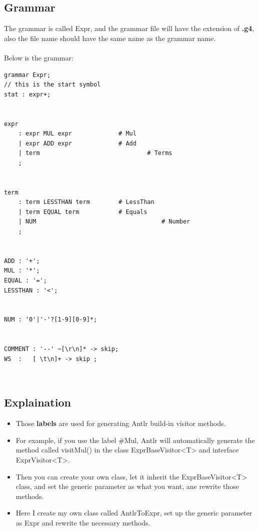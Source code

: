 \documentclass[a4paper,12pt,titlepage]{article}
\begin{document}
\subsection{Grammar}
The grammar is called {\footnotesize\ttfamily Expr}, and the grammar file will have the extension of {\bf .g4}, also the file name should have the same name as the grammar name.
\\
\\
Below is the grammar:
\begin{lstlisting}
grammar Expr;
// this is the start symbol
stat : expr+;


expr
	: expr MUL expr 			# Mul
	| expr ADD expr 			# Add
	| term 								# Terms
	;


term
	: term LESSTHAN term 		# LessThan
	| term EQUAL term 			# Equals
	| NUM 									# Number
	;


ADD : '+';
MUL : '*';
EQUAL : '=';
LESSTHAN : '<';


NUM : '0'|'-'?[1-9][0-9]*;


COMMENT : '--' ~[\r\n]* -> skip;
WS  :   [ \t\n]+ -> skip ;
\end{lstlisting}
~\\

\subsection{Explaination}
\begin{itemize}
  	\item Those {\bf labels} are used for generating Antlr build-in visitor methods.
  	\item For example, if you use the label {\footnotesize\ttfamily \#Mul}, Antlr will automatically generate the method called {\footnotesize\ttfamily visitMul()} in the class {\footnotesize\ttfamily ExprBaseVisitor<T>} and interface {\footnotesize\ttfamily ExprVisitor<T>}.
	\item Then you can create your own class, let it inherit the {\footnotesize\ttfamily ExprBaseVisitor<T>} class, and set the generic parameter as what you want, ane rewrite those methods.
	\item Here I create my own class called {\footnotesize\ttfamily AntlrToExpr}, set up the generic parameter as {\footnotesize\ttfamily Expr} and rewrite the necessary methods.
\end{itemize}
~\\
\end{document}
